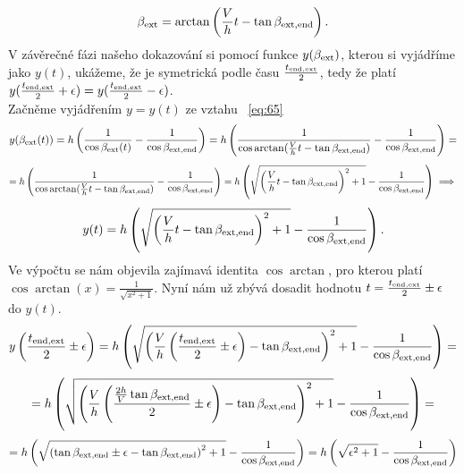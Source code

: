 \documentclass[reqno, a4paper]{amsart}
\begin{document}
\begin{equation}
	\label{eq:78}
	\beta_{\mathrm{ext}}=\arctan\left( \frac{V}{h}t - \tan \beta_{\mathrm{ext}, \mathrm{end}}\right) .
\end{equation}
V závěrečné fázi našeho dokazování si pomocí funkce $y(\beta_{\mathrm{ext}})$, kterou si vyjádříme jako $y(t)$, ukážeme, že je symetrická podle času $\frac{t_{\mathrm{end}, \mathrm{ext}}}{2}$, tedy že platí $y(\frac{t_{\mathrm{end}, \mathrm{ext}}}{2}+\epsilon)=y(\frac{t_{\mathrm{end}, \mathrm{ext}}}{2}-\epsilon)$.\\
Začněme vyjádřením $y=y(t)$ ze vztahu ~\eqref{eq:65}
\begin{equation}
	\label{eq:79}
	y(\beta_{\mathrm{ext}}(t))=h
	\left(
	\frac{1}{\cos \beta_{\mathrm{ext}}(t)}
	-
	\frac{1}{\cos \beta_{\mathrm{ext}, \mathrm{end}}}
	\right)=h
	\left(
	\frac{1}{\cos \arctan(\frac{V}{h}t - \tan \beta_{\mathrm{ext}, \mathrm{end}})}
	-
	\frac{1}{\cos \beta_{\mathrm{ext}, \mathrm{end}}}
	\right)=
\end{equation}
\begin{equation*}
	=h
	\left(
	\frac{1}{\cos \arctan(\frac{V}{h}t - \tan \beta_{\mathrm{ext}, \mathrm{end}})}
	-
	\frac{1}{\cos \beta_{\mathrm{ext}, \mathrm{end}}}
	\right)=h\left(
	\sqrt{\left( \frac{V}{h}t-\tan \beta_{\mathrm{ext}, \mathrm{end}}\right)^2 + 1 }
	-
	\frac{1}{\cos \beta_{\mathrm{ext}, \mathrm{end}}}
	\right) \implies
\end{equation*}
\begin{equation}
	\label{eq:80}
	y(t)=h\left(
	\sqrt{\left( \frac{V}{h}t-\tan \beta_{\mathrm{ext}, \mathrm{end}}\right)^2 + 1 }
	-
	\frac{1}{\cos \beta_{\mathrm{ext}, \mathrm{end}}}
	\right).
\end{equation}
Ve výpočtu se nám objevila zajímavá identita $\cos \arctan$, pro kterou platí $\cos \arctan (x)=\frac{1}{\sqrt{x^2+1}}$. Nyní nám už zbývá dosadit hodnotu $t = \frac{ t_{\mathrm{end}, \mathrm{ext}}}{2}\pm\epsilon$ do $y(t)$.
\begin{equation*}
	y\left( \frac{ t_{\mathrm{end}, \mathrm{ext}}}{2}\pm\epsilon\right) =h\left(
	\sqrt{\left( \frac{V}{h}\left( \frac{ t_{\mathrm{end}, \mathrm{ext}}}{2}\pm\epsilon\right) -\tan \beta_{\mathrm{ext}, \mathrm{end}}\right)^2 + 1 }
	-
	\frac{1}{\cos \beta_{\mathrm{ext}, \mathrm{end}}}
	\right)=
\end{equation*}
\begin{equation*}
	=h\left(
	\sqrt{\left( \frac{V}{h}\left( \frac{\frac{2h}{V}\tan\beta_{\mathrm{ext}, \mathrm{end}}}{2}\pm\epsilon\right) -\tan \beta_{\mathrm{ext}, \mathrm{end}}\right)^2 + 1 }
	-
	\frac{1}{\cos \beta_{\mathrm{ext}, \mathrm{end}}}
	\right)=
\end{equation*}
\begin{equation}
	\label{eq:81}
	=h\left(
	\sqrt{\left( \tan \beta_{\mathrm{ext}, \mathrm{end}}\pm\epsilon -\tan \beta_{\mathrm{ext}, \mathrm{end}}\right)^2 + 1 }
	-
	\frac{1}{\cos \beta_{\mathrm{ext}, \mathrm{end}}}
	\right)=h\left(\sqrt{\epsilon^2+1}-\frac{1}{\cos \beta_{\mathrm{ext}, \mathrm{end}}}
	\right)
\end{equation}
\end{document}
